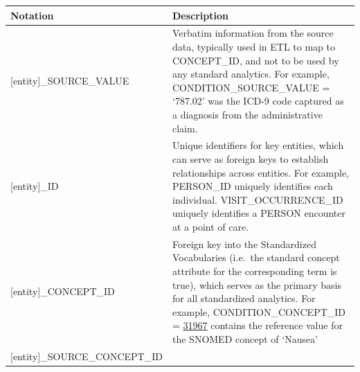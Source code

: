 \documentclass[]{book}
\begin{document}
\begin{longtable}[]{@{}ll@{}}
\toprule
\begin{minipage}[b]{0.24\columnwidth}\raggedright\strut
Notation\strut
\end{minipage} & \begin{minipage}[b]{0.70\columnwidth}\raggedright\strut
Description\strut
\end{minipage}\tabularnewline
\midrule
\endhead
\begin{minipage}[t]{0.24\columnwidth}\raggedright\strut
{[}entity{]}\_SOURCE\_VALUE\strut
\end{minipage} & \begin{minipage}[t]{0.70\columnwidth}\raggedright\strut
Verbatim information from the source data, typically used in ETL to map
to CONCEPT\_ID, and not to be used by any standard analytics. For
example, CONDITION\_SOURCE\_VALUE = `787.02' was the ICD-9 code captured
as a diagnosis from the administrative claim.\strut
\end{minipage}\tabularnewline
\begin{minipage}[t]{0.24\columnwidth}\raggedright\strut
{[}entity{]}\_ID\strut
\end{minipage} & \begin{minipage}[t]{0.70\columnwidth}\raggedright\strut
Unique identifiers for key entities, which can serve as foreign keys to
establish relationships across entities. For example, PERSON\_ID
uniquely identifies each individual. VISIT\_OCCURRENCE\_ID uniquely
identifies a PERSON encounter at a point of care.\strut
\end{minipage}\tabularnewline
\begin{minipage}[t]{0.24\columnwidth}\raggedright\strut
{[}entity{]}\_CONCEPT\_ID\strut
\end{minipage} & \begin{minipage}[t]{0.70\columnwidth}\raggedright\strut
Foreign key into the Standardized Vocabularies (i.e.~the standard
concept attribute for the corresponding term is true), which serves as
the primary basis for all standardized analytics. For example,
CONDITION\_CONCEPT\_ID =
\href{http://athena.ohdsi.org/search-terms/terms/31967}{31967} contains
the reference value for the SNOMED concept of `Nausea'\strut
\end{minipage}\tabularnewline
\begin{minipage}[t]{0.24\columnwidth}\raggedright\strut
{[}entity{]}\_SOURCE\_CONCEPT\_ID\strut
\end{minipage} & \begin{minipage}[t]{0.70\columnwidth}\raggedright\strut

\end{minipage}
\end{longtable}
\end{document}
